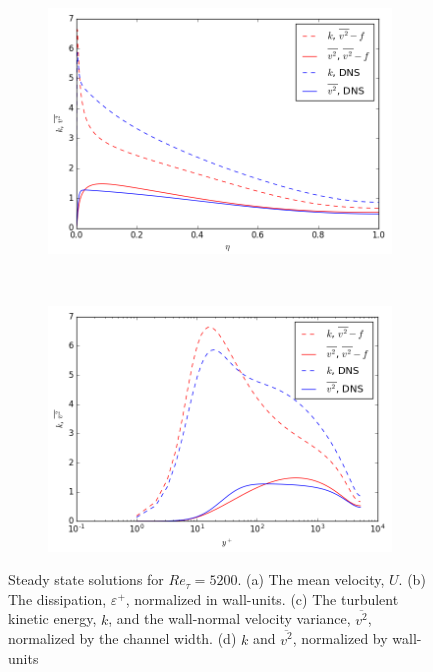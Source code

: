 \documentclass[a4paper,11pt]{article}
\begin{document}
\begin{figure}
	\begin{subfigure}[b]{0.45\textwidth} %
		\includegraphics[width=\textwidth]{k_y_5200}
		\caption{}
		\label{fig:results_v2_5200}
	\end{subfigure}
	~
	\begin{subfigure}[b]{0.45\textwidth} %
		\includegraphics[width=\textwidth]{k_yp_5200}
		\caption{}
		\label{fig:results_eps_5200}
	\end{subfigure}	
	\caption{Steady state solutions for $Re_{\tau} = 5200$. (a) The mean velocity, $U$. (b) The dissipation, $\varepsilon^+$, normalized in wall-units. (c) The turbulent kinetic energy, $k$, and the wall-normal velocity variance, $\overline{v^2}$, normalized by the channel width. (d) $k$ and $\overline{v^2}$, normalized by wall-units}
	\label{fig:Re5200_all}
\end{figure}
\end{document}
